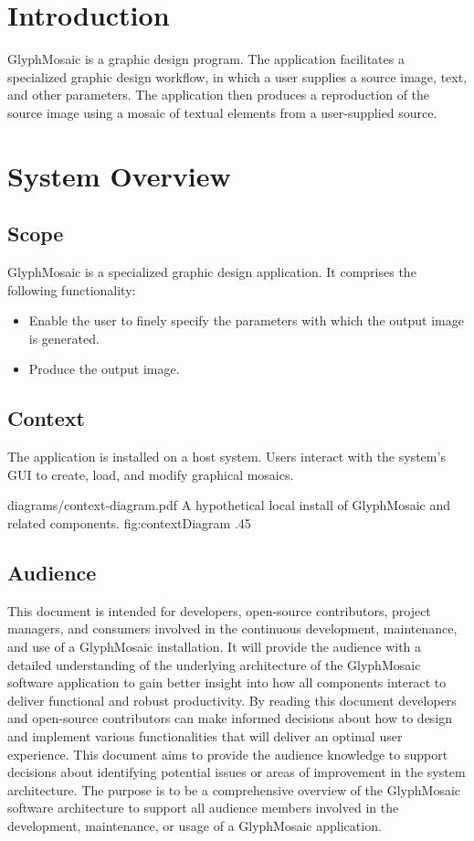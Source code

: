 \section{Introduction}
GlyphMosaic is a graphic design program.
The application facilitates a specialized graphic design workflow, in which a user supplies a source image, text, and other parameters.
The application then produces a reproduction of the source image using a mosaic of textual elements from a user-supplied source.


\section{System Overview}
\subsection{Scope}
GlyphMosaic is a specialized graphic design application.
It comprises the following functionality:
\begin{itemize}
  \item Enable the user to finely specify the parameters with which the output image is generated.
  \item Produce the output image.
\end{itemize}


\subsection{Context}
The application is installed on a host system.
Users interact with the system's GUI to create, load, and modify graphical mosaics.

\sidiagram
{diagrams/context-diagram.pdf}
{A hypothetical local install of GlyphMosaic and related components.}
{fig:contextDiagram}
{.45}


\subsection{Audience}
This document is intended for developers, open-source contributors, project managers, and consumers involved in the continuous development, maintenance, and use of a GlyphMosaic installation. 
It will provide the audience with a detailed understanding of the underlying architecture of the GlyphMosaic software application to gain better insight into how all components interact to deliver functional and robust productivity.
By reading this document developers and open-source contributors can make informed decisions about how to design and implement various functionalities that will deliver an optimal user experience.
This document aims to provide the audience knowledge to support decisions about identifying potential issues or areas of improvement in the system architecture.
The purpose is to be a comprehensive overview of the GlyphMosaic software architecture to support all audience members involved in the development, maintenance, or usage of a GlyphMosaic application.



